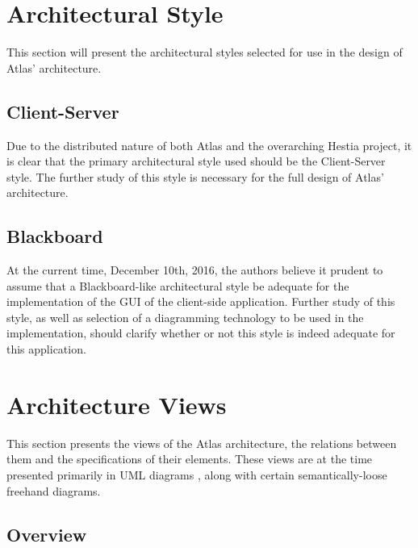 
\section{Architectural Style}

This section will present the architectural styles selected for use in the design of Atlas' architecture.


\subsection{Client-Server}

Due to the distributed nature of both Atlas and the overarching Hestia project, it is clear that the primary architectural style used should be the Client-Server style. The further study of this style is necessary for the full design of Atlas' architecture.


\subsection{Blackboard}

At the current time, December 10th, 2016, the authors believe it prudent to assume that a Blackboard-like architectural style be adequate for the implementation of the GUI of the client-side application. Further study of this style, as well as selection of a diagramming technology to be used in the implementation, should clarify whether or not this style is indeed adequate for this application.


\section{Architecture Views}

This section presents the views of the Atlas architecture, the relations between them and the specifications of their elements. These views are at the time presented primarily in UML diagrams \cite{OMG:2011}, along with certain semantically-loose freehand diagrams.


\subsection{Overview}

